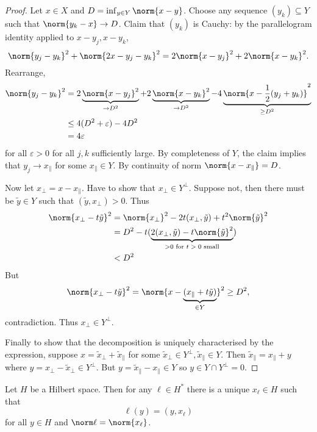 \documentclass[a4paper]{article}
\begin{document}
\begin{proof}
  Let \(x \in X\) and \(D = \inf_{y \in Y} \norm{x - y}\). Choose any sequence \((y_k) \subseteq Y\) such that \(\norm{y_k - x} \to D\). Claim that \((y_k)\) is Cauchy: by the parallelogram identity applied to \(x - y_j, x - y_k\),
  \[
    \norm{y_j - y_k}^2 + \norm{2x - y_j - y_k}^2 = 2 \norm{x - y_j}^2 + 2 \norm{x - y_k}^2.
  \]
  Rearrange,
  \begin{align*}
    \norm{y_j - y_k}^2
    &= 2 \underbrace{\norm{x - y_j}^2}_{\to D^2} + 2 \underbrace{\norm{x - y_k}^2}_{\to D^2} - 4 \underbrace{\norm{x - \frac{1}{2}(y_j + y_k)}^2}_{\geq D^2} \\
    &\leq 4(D^2 + \varepsilon) - 4D^2 \\
    &= 4\varepsilon
  \end{align*}
  for all \(\varepsilon > 0\) for all \(j, k\) sufficiently large. By completeness of \(Y\), the claim implies that \(y_j \to x_\parallel\) for some \(x_\parallel \in Y\). By continuity of norm \(\norm{x - x_\parallel} = D\).

  Now let \(x_\perp = x - x_\parallel\). Have to show that \(x_\perp \in Y^\perp\). Suppose not, then there must be \(\tilde y \in Y\) such that \((\tilde y, x_\perp) > 0\). Thus
  \begin{align*}
    \norm{x_\perp - t \tilde y}^2
    &= \norm{x_\perp}^2 - 2t(x_\perp, \tilde y) + t^2 \norm{\tilde y}^2 \\
    &= D^2 - t(\underbrace{2(x_\perp, \tilde y) - t\norm{\tilde y}^2}_{> 0 \text{ for \(t > 0\) small}}) \\
    &< D^2
  \end{align*}
  But
  \[
    \norm{x_\perp - t\tilde y}^2
    = \norm{x - \underbrace{(x_\parallel + t \tilde y)}_{\in Y}}^2
    \geq D^2,
  \]
  contradiction. Thus \(x_\perp \in Y^\perp\).

  Finally to show that the decomposition is uniquely characterised by the expression, suppose \(x = \tilde x_\perp + \tilde x_\parallel\) for some \(\tilde x_\perp \in Y^\perp, \tilde x_\parallel \in Y\). Then \(\tilde x_\parallel = x_\parallel + y\) where \(y = x_\perp - \tilde x_\perp \in Y^\perp\). But \(y = \tilde x_\parallel - x_\parallel \in Y\) so \(y \in Y \cap Y^\perp = 0\).
\end{proof}

\begin{theorem}
  Let \(H\) be a Hilbert space. Then for any \(\ell \in H^*\) there is a unique \(x_\ell \in H\) such that
  \[
    \ell(y) = (y, x_\ell)
  \]
  for all \(y \in H\) and \(\norm \ell = \norm{x_\ell}\).
\end{theorem}
\end{document}
